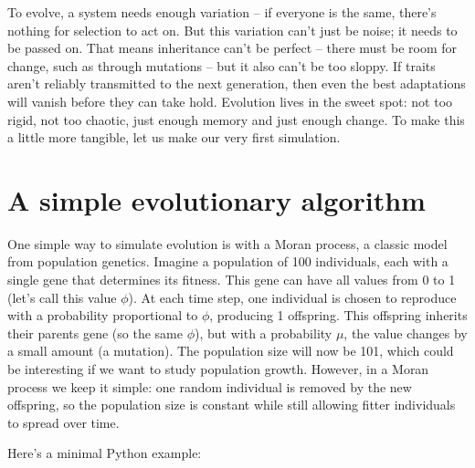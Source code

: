 \documentclass[
  letterpaper,
  DIV=11,
  numbers=noendperiod]{scrreprt}
\theoremstyle{definition}
\theoremstyle{remark}
\begin{document}
To evolve, a system needs enough variation -- if everyone is the same,
there's nothing for selection to act on. But this variation can't just
be noise; it needs to be passed on. That means inheritance can't be
perfect -- there must be room for change, such as through mutations --
but it also can't be too sloppy. If traits aren't reliably transmitted
to the next generation, then even the best adaptations will vanish
before they can take hold. Evolution lives in the sweet spot: not too
rigid, not too chaotic, just enough memory and just enough change. To
make this a little more tangible, let us make our very first simulation.

\section{A simple evolutionary
algorithm}\label{a-simple-evolutionary-algorithm}

One simple way to simulate evolution is with a Moran process, a classic
model from population genetics. Imagine a population of 100 individuals,
each with a single gene that determines its fitness. This gene can have
all values from 0 to 1 (let's call this value \(\phi\)). At each time
step, one individual is chosen to reproduce with a probability
proportional to \(\phi\), producing 1 offspring. This offspring inherits
their parents gene (so the same \(\phi\)), but with a probability
\(\mu\), the value changes by a small amount (a mutation). The
population size will now be 101, which could be interesting if we want
to study population growth. However, in a Moran process we keep it
simple: one random individual is removed by the new offspring, so the
population size is constant while still allowing fitter individuals to
spread over time.

Here's a minimal Python example:
\end{document}
